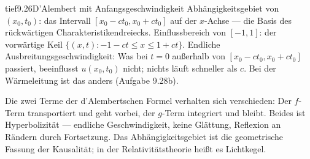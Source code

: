 \begin{loesungkarte}{tief}{9.26}{D'Alembert mit Anfangsgeschwindigkeit}
Abhängigkeitsgebiet von $(x_0, t_0)$: das Intervall $[x_0 - ct_0, x_0 + ct_0]$ auf der $x$-Achse --- die Basis des rückwärtigen Charakteristikendreiecks. Einflussbereich von $[-1, 1]$: der vorwärtige Keil $\{(x, t)\colon-1 - ct\le x\le1 + ct\}$. Endliche Ausbreitungsgeschwindigkeit: Was bei $t = 0$ außerhalb von $[x_0 - ct_0, x_0 + ct_0]$ passiert, beeinflusst $u(x_0, t_0)$ nicht; nichts läuft schneller als $c$. Bei der Wärmeleitung ist das anders (Aufgabe 9.28b).
\begin{mitnehmen}\kastentext
Die zwei Terme der d'Alembertschen Formel verhalten sich verschieden: Der $f$-Term transportiert und geht vorbei, der $g$-Term integriert und bleibt. Beides ist Hyperbolizität --- endliche Geschwindigkeit, keine Glättung, Reflexion an Rändern durch Fortsetzung. Das Abhängigkeitsgebiet ist die geometrische Fassung der Kausalität; in der Relativitätstheorie heißt es Lichtkegel.
\end{mitnehmen}
\end{loesungkarte}

